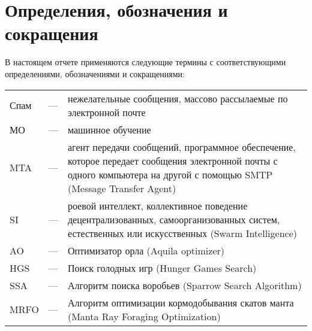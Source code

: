 \chapter*{Определения, обозначения и сокращения}

В настоящем отчете применяются следующие термины с соответствующими определениями, 
обозначениями и сокращениями:

\begingroup
\setlength{\baselineskip}{1.5em}
\renewcommand{\arraystretch}{1.5}
\begin{table}[ht]
    \begin{tabular}{ p{} p{} p{} } 
        Спам & — & нежелательные сообщения, массово рассылаемые по электронной почте \\
        МО & — & машинное обучение \\
        MTA & — & агент передачи сообщений, программное обеспечение, которое передает сообщения электронной почты с одного компьютера на другой с помощью SMTP (Message Transfer Agent) \\
        SI & — & роевой интеллект, коллективное поведение 
        децентрализованных, самоорганизованных систем, естественных или 
        искусственных (Swarm Intelligence) \\
        AO & — & Оптимизатор орла (Aquila optimizer) \\
        HGS & — & Поиск голодных игр (Hunger Games Search) \\
        SSA & — & Алгоритм поиска воробьев (Sparrow Search Algorithm) \\
        MRFO & — & Алгоритм оптимизации кормодобывания скатов манта (Manta Ray Foraging Optimization) \\
    \end{tabular} 
\end{table}
\endgroup